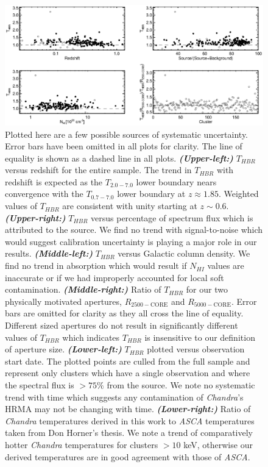 \clearpage
\begin{figure}[htp]
\begin{center}
\includegraphics[scale=1.0]{sys}
\caption{\small
Plotted here are a few possible sources of systematic uncertainty.
Error bars have been omitted in all plots for clarity. The line of
equality is shown as a dashed line in all
plots. {\bfseries\em{(Upper-left:)}} $T_{HBR}$ versus redshift for the
entire sample. The trend in $T_{HBR}$ with redshift is expected as the
$T_{2.0-7.0}$ lower boundary nears convergence with the $T_{0.7-7.0}$
lower boundary at $z \approx 1.85$. Weighted values of $T_{HBR}$ are
consistent with unity starting at $z \sim
0.6$. {\bfseries\em{(Upper-right:)}} $T_{HBR}$ versus percentage of
spectrum flux which is attributed to the source. We find no trend with
signal-to-noise which would suggest calibration uncertainty is playing
a major role in our results. {\bfseries\em{(Middle-left:)}} $T_{HBR}$
versus Galactic column density. We find no trend in absorption which
would result if $N_{HI}$ values are inaccurate or if we had improperly
accounted for local soft
contamination. {\bfseries\em{(Middle-right:)}} Ratio of $T_{HBR}$ for
our two physically motivated apertures, $R_{2500-\mathrm{CORE}}$ and
$R_{5000-\mathrm{CORE}}$. Error bars are omitted for clarity as they all
cross the line of equality. Different sized apertures do not result in
significantly different values of $T_{HBR}$ which indicates $T_{HBR}$
is insensitive to our definition of aperture
size. {\bfseries\em{(Lower-left:)}} $T_{HBR}$ plotted versus
observation start date. The plotted points are culled from the full
sample and represent only clusters which have a single observation and
where the spectral flux is $> 75\%$ from the source. We note no
systematic trend with time which suggests any contamination of {\it
Chandra}'s HRMA may not be changing with
time. {\bfseries\em{(Lower-right:)}} Ratio of {\it Chandra}
temperatures derived in this work to {\it ASCA} temperatures taken
from Don Horner's thesis. We note a trend of comparatively hotter {\it
Chandra} temperatures for clusters $> 10$ keV, otherwise our derived
temperatures are in good agreement with those of {\it ASCA}.
}
\label{fig:sys}
\end{center}
\end{figure}

